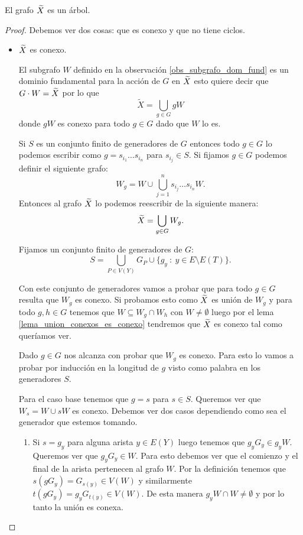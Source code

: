 \documentclass[tesis.tex]{subfiles}
\begin{document}
\begin{teo}[Serre]
	El grafo $\widetilde X$ es un árbol.
\end{teo}
\begin{proof}
	Debemos ver dos cosas: que es conexo y que no tiene ciclos.
	
	\begin{itemize}
		\item 
		$\widetilde X$ es conexo.
		
		
		El subgrafo $W$ definido en la observación \ref{obs_subgrafo_dom_fund} es un dominio fundamental para la acción de $G$ en $\widetilde X$ esto quiere decir que $G \cdot W = \widetilde X$ por lo que 
		\[
		\widetilde X = \bigcup_{g \in G} gW
		\]
		donde $gW$ es conexo para todo $g \in G$ dado que $W$ lo es.
		
		Si $S$ es un conjunto finito de generadores de $G$ entonces todo $g \in G$ lo podemos escribir como $g = s_{i_1} \dots s_{i_n}$ para $s_{i_j} \in S$.
		Si fijamos $g \in G$ podemos definir el siguiente grafo:
		\[
		W_{g} = W \cup \bigcup_{j=1}^{n} s_{i_{j}}\dots s_{i_{n}}W.
		\]
		Entonces al grafo $\widetilde X$ lo podemos reescribir de la siguiente manera:
		\[
		\widetilde X =  \bigcup_{g \in G} W_{g}.
		\]
		
		
		Fijamos un conjunto finito de generadores de $G$: 
		\[
		S = \bigcup_{P \in V(Y)} G_{P} \cup \{ g_y \ : \ y \in E \setminus E(T) \}.   
		\] 
		
		Con este conjunto de generadores vamos a probar que para todo $g \in G$ resulta que $W_{g}$ es conexo.
		Si probamos esto como $\widetilde X$ es unión de $W_{g}$ y 
		para todo $g, h \in G$
		tenemos que $W \subseteq W_{g} \cap W_{h}$ con $W \neq \emptyset$ luego por el lema \ref{lema_union_conexos_es_conexo} tendremos que $\widetilde X$ es conexo tal como queríamos ver.

		
		
		Dado $g \in G$ nos alcanza con probar que $W_{g}$ es conexo.
		Para esto lo vamos a probar por inducción en la longitud de $g$ visto como palabra en los generadores $S$.
		
		Para el caso base tenemos que $g = s$ para $s \in S$.
		Queremos ver que $W_{s} = W \cup sW$ es conexo.
		Debemos ver dos casos dependiendo como sea el generador que estemos tomando.
		\begin{enumerate}
			\item Si $s=g_y$ para alguna arista $y \in E(Y)$ luego tenemos que $g_yG_y \in g_{y}W$.
			Queremos ver que $g_{y}G_{y} \in W$.
			Para esto debemos ver que el comienzo y el final de la arista pertenecen al grafo $W$.
			Por la definición tenemos que $s(gG_{y}) = G_{s(y)} \in V(W)$ y similarmente $t(gG_{y}) = g_{y}G_{t(y)} \in V(W)$.
			De esta manera $g_yW \cap W \neq \emptyset$ y por lo tanto la unión es conexa.		
			

\end{enumerate}
\end{itemize}
\end{proof}
\end{document}

